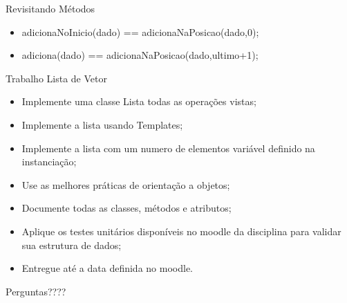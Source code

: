 \documentclass[12pt,table,xcolor={dvipsnames}]{beamer}
\begin{document}
\begin{frame}[fragile]{Revisitando Métodos}
\begin{itemize}
\item adicionaNoInicio(dado) == adicionaNaPosicao(dado,0);
\item adiciona(dado) == adicionaNaPosicao(dado,ultimo+1);
\end{itemize}
\end{frame}





\begin{frame}[fragile]{Trabalho Lista de Vetor}
\begin{itemize}
\item Implemente uma classe Lista todas as operações vistas;
\item Implemente a lista usando Templates;
\item Implemente a lista com um numero de elementos variável definido na instanciação;
\item Use as melhores práticas de orientação a objetos;
\item Documente todas as classes, métodos e atributos;
\item Aplique os testes unitários disponíveis no moodle da disciplina para validar sua estrutura de dados;
\item Entregue até a data definida no moodle.
\end{itemize}
\end{frame}

{
\begin{frame}

{\LARGE Perguntas????}

\end{frame}
}
\end{document}

